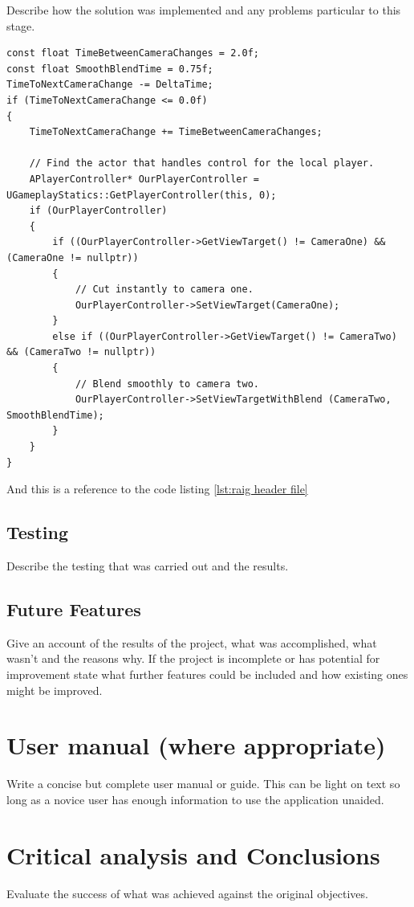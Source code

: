 \documentclass[12pt,a4paper,titlepage]{article}
\begin{document}
Describe how the solution was implemented and any problems particular to this stage.

\begin{lstlisting}[caption=EXAMPLE IRAIG.h interface used for game engine, label=lst:raig header file]
const float TimeBetweenCameraChanges = 2.0f;
const float SmoothBlendTime = 0.75f;
TimeToNextCameraChange -= DeltaTime;
if (TimeToNextCameraChange <= 0.0f)
{
    TimeToNextCameraChange += TimeBetweenCameraChanges;

    // Find the actor that handles control for the local player.
    APlayerController* OurPlayerController = UGameplayStatics::GetPlayerController(this, 0);
    if (OurPlayerController)
    {
        if ((OurPlayerController->GetViewTarget() != CameraOne) && (CameraOne != nullptr))
        {
            // Cut instantly to camera one.
            OurPlayerController->SetViewTarget(CameraOne);
        }
        else if ((OurPlayerController->GetViewTarget() != CameraTwo) && (CameraTwo != nullptr))
        {
            // Blend smoothly to camera two.
            OurPlayerController->SetViewTargetWithBlend (CameraTwo, SmoothBlendTime);
        }
    }
}
\end{lstlisting}

And this is a reference to the code listing \ref{lst:raig header file}
\subsection{Testing}

Describe the testing that was carried out and the results.

\subsection{Future Features}

Give an account of the results of the project, what was accomplished, what wasn't and the reasons why. If the project is incomplete or has potential for improvement state what further features could be included and how existing ones might be improved.

\section{User manual (where appropriate)}
Write a concise but complete user manual or guide. This can be light on text so long as a novice user has enough information to use the application unaided.

\section{Critical analysis and Conclusions}
Evaluate the success of what was achieved against the original objectives. 
\end{document}
